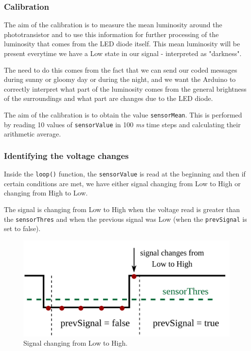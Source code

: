 \documentclass[12pt]{report}
\begin{document}
\subsubsection{Calibration}

The aim of the calibration is to measure the mean luminosity around the phototransistor and to use this information for further processing of the luminosity that comes from the LED diode itself. This mean luminosity will be present everytime we have a Low state in our signal - interpreted as "darkness".

The need to do this comes from the fact that we can send our coded messages during sunny or gloomy day or during the night, and we want the Arduino to correctly interpret what part of the luminosity comes from the general brightness of the surroundings and what part are changes due to the LED diode.

The aim of the calibration is to obtain the value \verb|sensorMean|. This is performed by reading 10 values of \verb|sensorValue| in 100 \textit{ms} time steps and calculating their arithmetic average.

\subsubsection{Identifying the voltage changes}

Inside the \verb|loop()| function, the \verb|sensorValue| is read at the beginning and then if certain conditions are met, we have either signal changing from Low to High or changing from High to Low.

The signal is changing from Low to High when the voltage read is greater than the \verb|sensorThres| and when the previous signal was Low (when the \verb|prevSignal| is set to false).

\begin{figure}[H]
\centering\includegraphics[scale=0.18]{lowtohigh}
\caption{Signal changing from Low to High.}				
\label{fig:arduino_code}
\end{figure}
\end{document}
